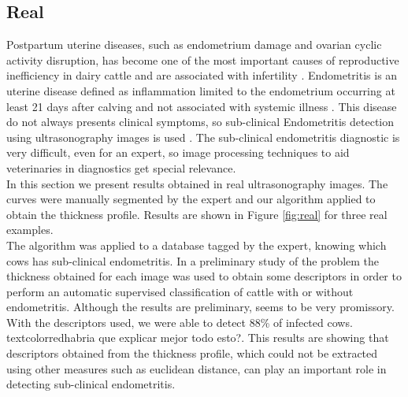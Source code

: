 \documentclass{article}
\begin{document}
\subsection{Real}
\label{ssec:real}
Postpartum uterine diseases, such as endometrium damage and ovarian cyclic activity disruption, has become one of the most important causes of reproductive inefficiency in dairy cattle and are associated with infertility \cite{sheldon2008,barlund2008}. Endometritis is an uterine disease defined as inflammation limited to the endometrium occurring at least 21 days after calving and not associated with systemic illness \cite{sheldon2010}. This disease do not always presents clinical symptoms, so sub-clinical Endometritis detection using ultrasonography images is used \cite{Gianni2010, Gianni2013}. The sub-clinical endometritis diagnostic is very difficult, even for an expert, so image processing techniques to aid veterinaries in diagnostics get special relevance.\\

In this section we present results obtained in real ultrasonography images. The curves were manually segmented by the expert and our algorithm applied to obtain the thickness profile. Results are shown in Figure \ref{fig:real} for three real examples.\\

The algorithm was applied to a database tagged by the expert, knowing which cows has sub-clinical endometritis. In a preliminary study of the problem the thickness obtained for each image was used to obtain some descriptors in order to perform an automatic supervised classification of cattle with or without endometritis. Although the results are preliminary, seems to be very promissory. With the descriptors used, we were able to detect 88\% of infected cows. textcolor{red}{habria que explicar mejor todo esto?}. This results are showing that descriptors obtained from the thickness profile, which could not be extracted using other measures such as euclidean distance, can play an important role in detecting sub-clinical endometritis.
\end{document}

